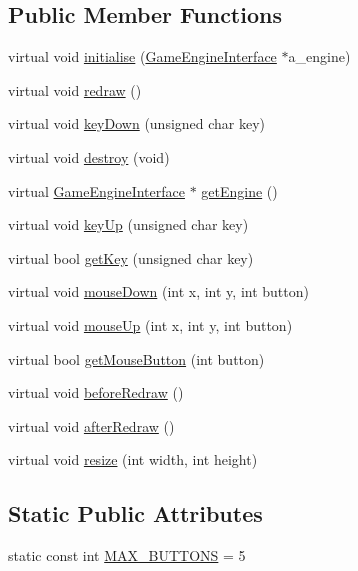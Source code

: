 \subsection*{Public Member Functions}
\begin{DoxyCompactItemize}
\item 
virtual void \hyperlink{classMapWindow_affdeec7b3b899c38f16d04d170970e70}{initialise} (\hyperlink{classGameEngineInterface}{Game\-Engine\-Interface} $\ast$a\-\_\-engine)
\item 
virtual void \hyperlink{classMapWindow_a5759338c3758b2a3252ffc691958dff8}{redraw} ()
\item 
virtual void \hyperlink{classMapWindow_a289795e503a5aa600e4091f5aa8b0b8c}{key\-Down} (unsigned char key)
\item 
virtual void \hyperlink{classWindow_ae0ed7fd17df30f2d262cb684560e0469}{destroy} (void)
\item 
virtual \hyperlink{classGameEngineInterface}{Game\-Engine\-Interface} $\ast$ \hyperlink{classWindow_a55a6e31e36665bd3bcffcd844f5f0385}{get\-Engine} ()
\item 
virtual void \hyperlink{classWindow_a249f5a9513be00e59428a1df37502c63}{key\-Up} (unsigned char key)
\item 
virtual bool \hyperlink{classWindow_ac0927d0b89776959c4a95dd6737f841f}{get\-Key} (unsigned char key)
\item 
virtual void \hyperlink{classWindow_ace3bd5e6614510fce97263eccc35c0ab}{mouse\-Down} (int x, int y, int button)
\item 
virtual void \hyperlink{classWindow_a2e2c7592975405513a05a2da6a512b1c}{mouse\-Up} (int x, int y, int button)
\item 
virtual bool \hyperlink{classWindow_ab824bd52a5a055e468f7b2cc3d0b4f54}{get\-Mouse\-Button} (int button)
\item 
virtual void \hyperlink{classWindow_a1344118a395cb2fc48d4a2359372b074}{before\-Redraw} ()
\item 
virtual void \hyperlink{classWindow_a05b1d6673e37db442ecd80c54d10e6b7}{after\-Redraw} ()
\item 
virtual void \hyperlink{classWindow_a6e4274c73728009132b7e0dfad42a8de}{resize} (int width, int height)
\end{DoxyCompactItemize}
\subsection*{Static Public Attributes}
\begin{DoxyCompactItemize}
\item 
static const int \hyperlink{classWindow_a78a36ba2259fdd12ad2cf3346430fb35}{M\-A\-X\-\_\-\-B\-U\-T\-T\-O\-N\-S} = 5
\end{DoxyCompactItemize}
